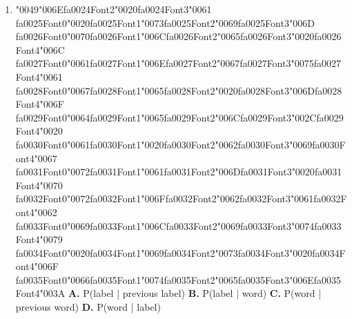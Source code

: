 \documentclass[11pt]{article}
\begin{document}
\begin{enumerate}[leftmargin=*]
    \textbf{A.} It uses only words (observations) and ignores labels
    \textbf{B.} It is identical to an HMM
    \textbf{C.} It models transitions between labels but does not consider the words
    \textbf{D.} It models emissions P(word | label)

  \item {\char"0049}{\char"006E}{\csname fa0024Font2\endcsname\char"0020}{\csname fa0024Font3\endcsname\char"0061} {\csname fa0025Font0\endcsname\char"0020}{\csname fa0025Font1\endcsname\char"0073}{\csname fa0025Font2\endcsname\char"0069}{\csname fa0025Font3\endcsname\char"006D} {\csname fa0026Font0\endcsname\char"0070}{\csname fa0026Font1\endcsname\char"006C}{\csname fa0026Font2\endcsname\char"0065}{\csname fa0026Font3\endcsname\char"0020}{\csname fa0026Font4\endcsname\char"006C} {\csname fa0027Font0\endcsname\char"0061}{\csname fa0027Font1\endcsname\char"006E}{\csname fa0027Font2\endcsname\char"0067}{\csname fa0027Font3\endcsname\char"0075}{\csname fa0027Font4\endcsname\char"0061} {\csname fa0028Font0\endcsname\char"0067}{\csname fa0028Font1\endcsname\char"0065}{\csname fa0028Font2\endcsname\char"0020}{\csname fa0028Font3\endcsname\char"006D}{\csname fa0028Font4\endcsname\char"006F} {\csname fa0029Font0\endcsname\char"0064}{\csname fa0029Font1\endcsname\char"0065}{\csname fa0029Font2\endcsname\char"006C}{\csname fa0029Font3\endcsname\char"002C}{\csname fa0029Font4\endcsname\char"0020} {\csname fa0030Font0\endcsname\char"0061}{\csname fa0030Font1\endcsname\char"0020}{\csname fa0030Font2\endcsname\char"0062}{\csname fa0030Font3\endcsname\char"0069}{\csname fa0030Font4\endcsname\char"0067} {\csname fa0031Font0\endcsname\char"0072}{\csname fa0031Font1\endcsname\char"0061}{\csname fa0031Font2\endcsname\char"006D}{\csname fa0031Font3\endcsname\char"0020}{\csname fa0031Font4\endcsname\char"0070} {\csname fa0032Font0\endcsname\char"0072}{\csname fa0032Font1\endcsname\char"006F}{\csname fa0032Font2\endcsname\char"0062}{\csname fa0032Font3\endcsname\char"0061}{\csname fa0032Font4\endcsname\char"0062} {\csname fa0033Font0\endcsname\char"0069}{\csname fa0033Font1\endcsname\char"006C}{\csname fa0033Font2\endcsname\char"0069}{\csname fa0033Font3\endcsname\char"0074}{\csname fa0033Font4\endcsname\char"0079} {\csname fa0034Font0\endcsname\char"0020}{\csname fa0034Font1\endcsname\char"0069}{\csname fa0034Font2\endcsname\char"0073}{\csname fa0034Font3\endcsname\char"0020}{\csname fa0034Font4\endcsname\char"006F} {\csname fa0035Font0\endcsname\char"0066}{\csname fa0035Font1\endcsname\char"0074}{\csname fa0035Font2\endcsname\char"0065}{\csname fa0035Font3\endcsname\char"006E}{\csname fa0035Font4\endcsname\char"003A}
    \textbf{A.} P(label | previous label)
    \textbf{B.} P(label | word)
    \textbf{C.} P(word | previous word)
    \textbf{D.} P(word | label)


\end{enumerate}
\end{document}
